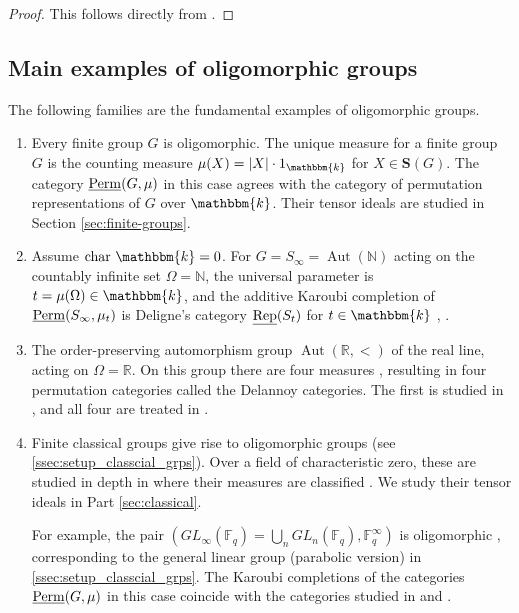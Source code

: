 \documentclass[11pt,a4paper]{amsart}
\theoremstyle{plain}%
\theoremstyle{definition}
\theoremstyle{remark}
\newcommand{\Aut}{{\operatorname{Aut}}}
\newcommand{\bR}{{\mathbb R}}
\newcommand{\uRep}{\underline{{\rm Rep}}}
\newcommand{\Perm}{\underline{{\rm Perm}}}
\newcommand{\F}{{\mathbb F}}
\newcommand{\kk}{\mathbbm{k}}
\newcommand{\Set}[1]{\mathbf{S}(#1)}
\begin{document}
\begin{proof}
This follows directly from \cite[Proposition~7.21(c)]{HS-oligomorphic}.
\end{proof}

\subsection{Main examples of oligomorphic groups}\label{subsec:main-examples}



The following families are the fundamental examples of oligomorphic groups.
\begin{enumerate}[itemindent=0pt,leftmargin=*]
\item Every finite group $G$ is oligomorphic. The unique measure for a finite group $G$ is the counting measure $\mu(X)=|X|\cdot 1_{\kk}$ for $X\in \Set{G}$. The category $\Perm(G,\mu)$ in this case agrees with the category of permutation representations of $G$ over $\kk$. Their tensor ideals are studied in Section \ref{sec:finite-groups}.

\item Assume $\mathrm{char} ~ \kk = 0$. For $G=S_\infty= \Aut(\mathbb{N})$ acting on the countably infinite set $\Omega=\mathbb{N}$, the universal parameter  is $t=\mu(\Omega) \in \kk$, and the additive Karoubi completion of $\Perm(S_\infty,\mu_t)$ is Deligne's category $\uRep(S_t)$ for $t \in \kk$ \cite[\S14]{HS-oligomorphic}, \cite{Del07}.
      
\item The order-preserving automorphism group $\Aut(\bR, <)$ of the real line, acting on $\Omega=\bR$. On this group there are four measures \cite[Theorem 16.7]{HS-oligomorphic}, resulting in four permutation categories called the Delannoy categories. The first is studied in \cite{HSS-delannoy}, and all four are treated in \cite{CHS-delannoy}.

\item Finite classical groups give rise to oligomorphic groups (see \cref{ssec:setup_classcial_grps}). Over a field of characteristic zero, these are studied in depth in \cite{HS-classical} where their measures are classified \cite[\S\S6,8,9,10]{HS-classical}. We study their tensor ideals in Part \ref{sec:classical}. 

For example, the pair $(GL_{\infty}(\mathbb{F}_q) = \bigcup_n GL_n(\mathbb{F}_q), \F_q^{\infty})$ is oligomorphic \cite{HS-oligomorphic}, corresponding to the  general linear group (parabolic version) in \cref{ssec:setup_classcial_grps}. The Karoubi completions of the categories $\Perm(G,\mu)$ in this case coincide with the categories studied in \cite{Knop} and \cite{EAHGL}. 

 


\end{enumerate}
\end{document}
